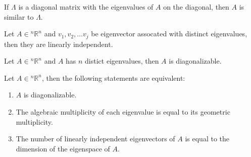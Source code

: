 \documentclass[11pt]{article}
\begin{document}
\begin{theorem}
    If $\Lambda$ is a diagonal matrix with the eigenvalues of $A$ on the diagonal, then $A$ is similar to $\Lambda$.
\end{theorem}
\begin{lemma}
    Let $A \in {^n\mathbb{R}^n}$ and $v_1, v_2, \dots v_j$ be eigenvector assocated with distinct eigenvalues, then they are linearly independent.
\end{lemma}
\begin{theorem}
    Let $A \in {^n\mathbb{R}^n}$ and $A$ has $n$ distict eigenvalues, then $A$ is diagonalizable.
\end{theorem}
\begin{theorem}
    Let $A \in {^n\mathbb{R}^n}$, then the following statements are equivalent:
    \begin{enumerate}
        \item $A$ is diagonalizable.
        \item The algebraic multiplicity of each eigenvalue is equal to its geometric multiplicity.
        \item The number of linearly independent eigenvectors of $A$ is equal to the dimension of the eigenspace of $A$.
    \end{enumerate}
\end{theorem}
\end{document}

